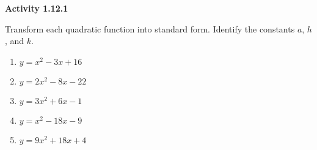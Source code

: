 \vspace{1ex}
\noindent\textbf{Activity 1.12.1}

\vspace{0.75ex}

Transform each quadratic function into standard form. Identify the constants $a$, 
 $h$, and $k$.
\begin{multicols}{2}
\begin{enumerate}[label = \color{blue}\arabic*. ]
\item $ y = x^{2} - 3x + 16 $
\item $ y = 2x^{2} - 8x - 22 $
\item $ y = 3x^{2} + 6x - 1 $
\item $ y = x^{2} - 18x - 9 $
\item $ y = 9x^{2} + 18x + 4 $
\end{enumerate}
\end{multicols} 
